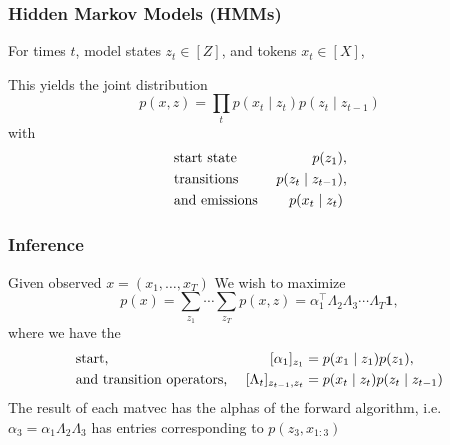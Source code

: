 \documentclass{beamer}
\begin{document}
\begin{frame}
\frametitle{Hidden Markov Models (HMMs)}

For times $t$, model states $z_t \in [Z]$, and tokens $x_t \in [X]$,

\begin{center}
\end{center}

This yields the joint distribution
$$p(x,z) = \prod_t p(x_t \mid z_t)p(z_t \mid z_{t-1})$$
%
with 
\begin{align*}
&\textnormal{start state } & p(z_1)&,\\
&\textnormal{transitions } & p(z_t \mid z_{t-1})&,\\
&\textnormal{and emissions } &  p(x_t \mid z_t)&
\end{align*}

\end{frame}



\begin{frame}
\frametitle{Inference}
Given observed $x = (x_1, \ldots, x_T)$
\vspace{1em}
We wish to maximize
\begin{equation*}
p(x)
= \sum_{z_1}\cdots\sum_{z_T}p(x, z)
= \alpha_1^\top\Lambda_2\Lambda_3\cdots\Lambda_T\bm1,
\end{equation*}
where we have the
\begin{align*}
&\textnormal{start, } & [\alpha_1]_{z_1} &= p(x_1\mid z_1)p(z_1),\\
&\textnormal{and transition operators, }
    & [\Lambda_t]_{z_{t-1},z_t} &= p(x_t \mid z_t)p(z_t \mid z_{t-1})
\end{align*}
The result of each matvec has the alphas of the forward algorithm,
i.e. $\alpha_3 = \alpha_1\Lambda_2\Lambda_3$ has entries corresponding to $p(z_3, x_{1:3})$
\end{frame}
\end{document}
